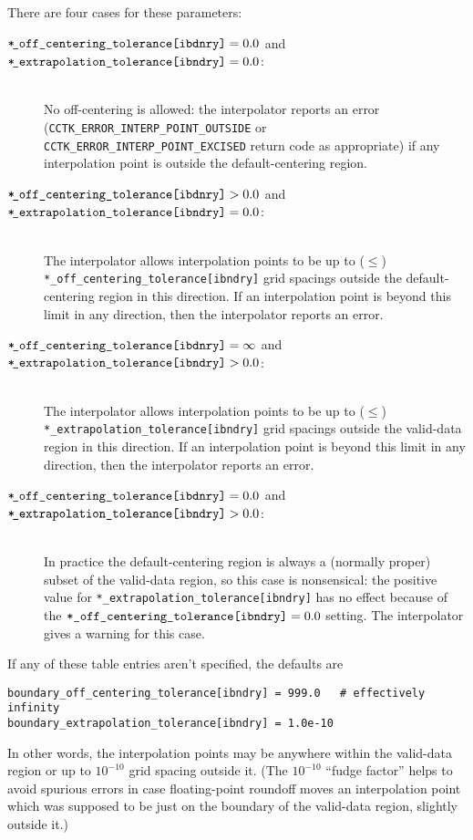 There are four cases for these parameters:
\begin{description}
\item[
      $\text{\tt *\!\_off\_centering\_tolerance[ibdnry]} = 0.0$ and
      $\text{\tt *\!\_extrapolation\_tolerance[ibndry]} = 0.0$:]\mbox{}\\
	No off-centering is allowed: the interpolator reports an
	error (\verb|CCTK_ERROR_INTERP_POINT_OUTSIDE| or
	\verb|CCTK_ERROR_INTERP_POINT_EXCISED| return code
	as appropriate) if any interpolation point is outside
	the default-centering region.
\item[
      $\text{\tt *\!\_off\_centering\_tolerance[ibdnry]} > 0.0$ and
      $\text{\tt *\!\_extrapolation\_tolerance[ibndry]} = 0.0$:]\mbox{}\\
	The interpolator allows interpolation points to be up to ($\le$)
	\verb|*_off_centering_tolerance[ibndry]| grid spacings outside
	the default-centering region in this direction.
	If an interpolation point is beyond this limit in any
	direction, then the interpolator reports an error.
\item[
      $\text{\tt *\!\_off\_centering\_tolerance[ibdnry]} = \infty$%
\footnotemark{}%
{}    and
      $\text{\tt *\!\_extrapolation\_tolerance[ibndry]} > 0.0$:]\mbox{}\\
	The interpolator allows interpolation points to be up to ($\le$)
	\verb|*_extrapolation_tolerance[ibndry]| grid spacings outside
	the valid-data region in this direction.
	If an interpolation point is beyond this limit in any
	direction, then the interpolator reports an error.
\item[
      $\text{\tt *\!\_off\_centering\_tolerance[ibdnry]} = 0.0$ and
      $\text{\tt *\!\_extrapolation\_tolerance[ibndry]} > 0.0$:]\mbox{}\\
	In practice the default-centering region is always a
	(normally proper) subset of the valid-data region, so this
	case is nonsensical: the positive value for
	\verb|*_extrapolation_tolerance[ibndry]| has no effect
	because of the $\verb|*_off_centering_tolerance[ibndry]| = 0.0$
	setting.  The interpolator gives a warning for this case.
\end{description}

If any of these table entries aren't specified, the defaults are
\begin{verbatim}
boundary_off_centering_tolerance[ibndry] = 999.0   # effectively infinity
boundary_extrapolation_tolerance[ibndry] = 1.0e-10
\end{verbatim}
In other words, the interpolation points may be anywhere within the
valid-data region or up to $10^{-10}$ grid spacing outside it.  (The
$10^{-10}$ ``fudge factor'' helps to avoid spurious errors in case
floating-point roundoff moves an interpolation point which was supposed
to be just on the boundary of the valid-data region, slightly outside it.)

